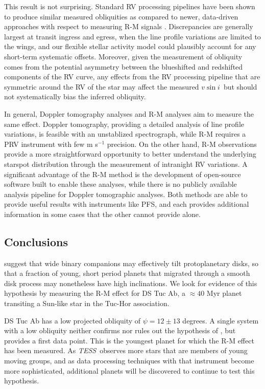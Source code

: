 \documentclass[twocolumn]{aastex63}
\newcommand{\tess}{{\it TESS}}
\newcommand{\vsini}{{$v \sin i$}}
\begin{document}
This result is not surprising. Standard RV processing pipelines have been shown to produce similar measured obliquities as compared to newer, data-driven approaches with respect to measuring R-M signals \citep{Bedell19}. Discrepancies are generally largest at transit ingress and egress, when the line profile variations are limited to the wings, and our flexible stellar activity model could plausibly account for any short-term systematic offsets.
Moreover, given the measurement of obliquity comes from the potential asymmetry between the blueshifted and redshifted components of the RV curve, any effects from the RV processing pipeline that are symmetric around the RV of the star may affect the measured \vsini\ but should not systematically bias the inferred obliquity.

In general, Doppler tomography analyses and R-M analyses aim to measure the same effect. Doppler tomography, providing a detailed analysis of line profile variations, is feasible with an unstablized spectrograph, while R-M requires a PRV instrument with few m s$^{-1}$ precision. On the other hand, R-M observations provide a more straightforward opportunity to better understand the underlying starspot distribution through the measurement of intranight RV variations. A significant advantage of the R-M method is the development of open-source software built to enable these analyses, while there is no publicly available analysis pipeline for Doppler tomographic analyses. Both methods are able to provide useful results with instruments like PFS, and each provides additional information in some cases that the other cannot provide alone.

\subsection{Conclusions}

\citet{Batygin12} suggest that wide binary companions may effectively tilt protoplanetary disks, so that a fraction of young, short period planets that migrated through a smooth disk process may nonetheless have high inclinations. 
We look for evidence of this hypothesis by measuring the R-M effect for DS Tuc Ab, a $\approx 40$ Myr planet transiting a Sun-like star in the Tuc-Hor association. 

DS Tuc Ab has a low projected obliquity of $\psi = 12 \pm 13$ degrees. A single system with a low obliquity neither confirms nor rules out the hypothesis of \citet{Batygin12}, but provides a first data point.
This is the youngest planet for which the R-M effect has been measured. As \tess\ observes more stars that are members of young moving groups, and as data processing techniques with that instrument become more sophisticated, additional planets will be discovered to continue to test this hypothesis.
\end{document}
